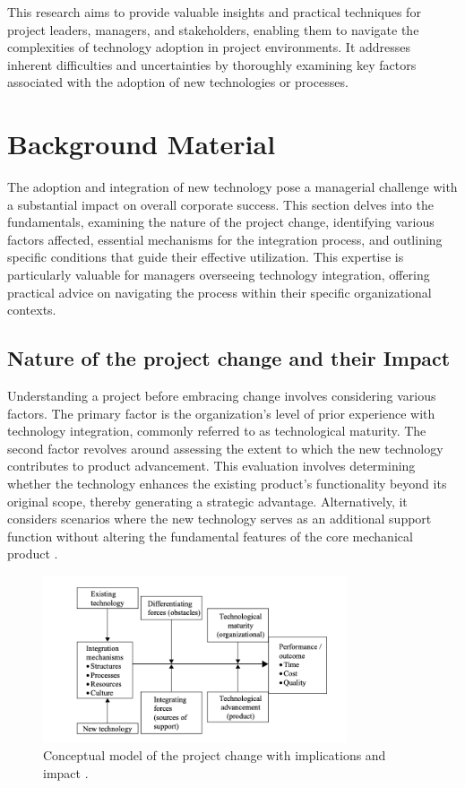 \documentclass{article}
\begin{document}
\noindent This research aims to provide valuable insights and practical techniques for project leaders, managers, and stakeholders, enabling them to navigate the complexities of technology adoption in project environments. It addresses inherent difficulties and uncertainties by thoroughly examining key factors associated with the adoption of new technologies or processes.

\section{Background Material}
The adoption and integration of new technology pose a managerial challenge with a substantial impact on overall corporate success. This section delves into the fundamentals, examining the nature of the project change, identifying various factors affected, essential mechanisms for the integration process, and outlining specific conditions that guide their effective utilization. This expertise is particularly valuable for managers overseeing technology integration, offering practical advice on navigating the process within their specific organizational contexts.


\subsection{Nature of the project change and their Impact}
Understanding a project before embracing change involves considering various factors. The primary factor is the organization's level of prior experience with technology integration, commonly referred to as technological maturity. The second factor revolves around assessing the extent to which the new technology contributes to product advancement. This evaluation involves determining whether the technology enhances the existing product's functionality beyond its original scope, thereby generating a strategic advantage. Alternatively, it considers scenarios where the new technology serves as an additional support function without altering the fundamental features of the core mechanical product \cite{reference1}.


\begin{figure}[h]
    \centering
    \includegraphics[width=0.8\textwidth]{Figure1.png}
    \caption{Conceptual model of the project change with implications and impact \cite{reference1}.}
    \label{fig:conceptual-model}
\end{figure}
\end{document}
